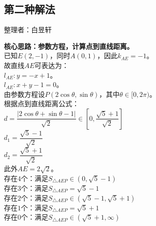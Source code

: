\documentclass[UTF8]{ctexart}
\begin{document}
\subsection{第二种解法}
    \begin{center}
        整理者：白昱轩
    \end{center}
    \begin{multicols}{2}
        \small
        \textbf{核心思路：参数方程，计算点到直线距离。}\\[5mm]
        已知$E(2,-1)$，同时$A(0,1)$，因此$k_{AE}=-1$。\\[5mm]
        故直线$AE$可表达为：\\[5mm]
        $l_{AE} : y = -x + 1$。\\[5mm]
        $l_{AE} : x+y-1=0$。\\[5mm]
        由参数方程设$P(2\cos\theta,\sin\theta)$，其中$\theta\in[0,2\pi)$。\\[5mm]
        根据点到直线距离公式：\\[5mm]
        $d = \dfrac{|2\cos\theta+\sin\theta-1|}{\sqrt{2}} \in \left[0,\dfrac{\sqrt{5}+1}{\sqrt{2}}\right]$\\[5mm]
        $d_1 = \dfrac{\sqrt{5}-1}{\sqrt{2}}$\\[5mm]
        $d_2 = \dfrac{\sqrt{5}+1}{\sqrt{2}}$\\[5mm]
        此外$AE=2\sqrt{2}$。\\[5mm]
        存在$4$个：满足$S_{\triangle AEP} \in \left(0,\sqrt{5}-1\right)$\\[5mm]
        存在$3$个：满足$S_{\triangle AEP} = \sqrt{5}-1$\\[5mm]
        存在$2$个：满足$S_{\triangle AEP} \in \left(\sqrt{5}-1,\sqrt{5}+1\right)$\\[5mm]
        存在$1$个：满足$S_{\triangle AEP}= \sqrt{5}+1$\\[5mm]
        存在$0$个：满足$S_{\triangle AEP} \in \left(\sqrt{5}+1,\infty \right)$
        \newpage
    \end{multicols}
\end{document}
